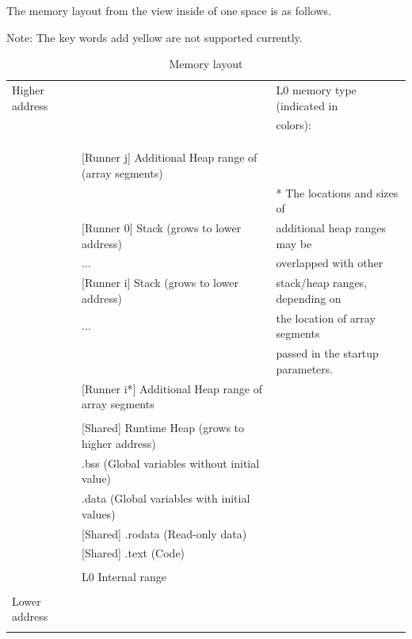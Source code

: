 \documentclass[a4paper]{article}
\begin{document}
The memory layout from the view inside of one space is as follows.

\begin{table}[!ht]
\centering
\caption{Memory layout}
\begin{tablenotes}
\small
\centering
\item Note: The key words add yellow are not supported currently.
\end{tablenotes}
\begin{tabular}{|l|l|l|}
\hline
Higher address & & L0 memory type (indicated in\\
 & & colors):\\\cline{2-2}
 & & \color{webgreen}{Heap} \\ %
 & & \color{red!20!white}{Stack} \\ %
 & & \\ \cline{2-2}
 & \colorbox{webgreen}{[Runner j] Additional Heap range of (array segments)} & \\ \cline{2-2}
 & & * The locations and sizes of\\ \cline{2-2}
 & \colorbox{red!20!white}{[Runner 0] Stack (grows to lower address)} & additional heap ranges may be\\\cline{2-2}
 & \colorbox{red!20!white}{...} & overlapped with other\\\cline{2-2}
 & \colorbox{red!20!white}{[Runner i] Stack (grows to lower address)} & stack/heap ranges, depending on\\\cline{2-2}
 & \colorbox{red!20!white}{...} & the location of array segments\\\cline{2-2}
 & & passed in the startup parameters.\\\cline{2-2}
 & \colorbox{webgreen}{[Runner i*] Additional Heap range of array segments} & \\\cline{2-2}
 & & \\\cline{2-2}
 & \colorbox{webgreen}{[Shared] Runtime Heap (grows to higher address)} & \\\cline{2-2}
 & \colorbox{webgreen}{.bss (Global variables without initial value)} & \\\cline{2-2}
 & \colorbox{webgreen}{.data (Global variables with initial values)} & \\\cline{2-2}
 & \colorbox{webgreen}{[Shared] .rodata (Read-only data)} & \\\cline{2-2}
 & \colorbox{webgreen}{[Shared] .text (Code)} & \\\cline{2-2}
 & & \\\cline{2-2}
 & L0 Internal range & \\\cline{2-2}
 & & \\\cline{2-2}
 Lower address & & \\
 & & \\\cline{2-2}
\hline
\end{tabular}
\label{table:c0-memory}
\end{table}
\end{document}
